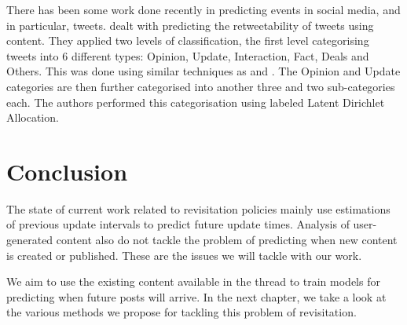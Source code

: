 There has been some work done recently in predicting events in social media, and 
in particular, tweets.   dealt with predicting the retweetability 
of tweets using content. They applied two levels of classification, the first 
level categorising tweets into 6 different types: Opinion, Update, Interaction, 
Fact, Deals and Others. This was done using similar techniques as 
 and . The Opinion and Update categories 
are then further categorised into another three and two sub-categories each. The 
authors performed this categorisation using labeled Latent Dirichlet Allocation.






\section{Conclusion}
The state of current work related to revisitation policies mainly use 
estimations of previous update intervals to predict future update times.  
Analysis of user-generated content also do not tackle the problem of predicting 
when new content is created or published. These are the issues we will tackle 
with our work.

We aim to use the existing content available in the thread to train models for 
predicting when future posts will arrive. In the next chapter, we take a look at 
the various methods we propose for tackling this problem of revisitation.
